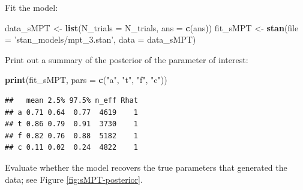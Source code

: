 \documentclass[12pt,]{krantz}
\newenvironment{Shaded}{\begin{snugshade}}{\end{snugshade}}
\newcommand{\KeywordTok}[1]{\textcolor[rgb]{0.13,0.29,0.53}{\textbf{#1}}}
\newcommand{\DataTypeTok}[1]{\textcolor[rgb]{0.13,0.29,0.53}{#1}}
\newcommand{\DecValTok}[1]{\textcolor[rgb]{0.00,0.00,0.81}{#1}}
\newcommand{\StringTok}[1]{\textcolor[rgb]{0.31,0.60,0.02}{#1}}
\newcommand{\OperatorTok}[1]{\textcolor[rgb]{0.81,0.36,0.00}{\textbf{#1}}}
\newcommand{\NormalTok}[1]{#1}
\theoremstyle{definition}
\theoremstyle{definition}
\theoremstyle{definition}
\theoremstyle{remark}
\begin{document}
Fit the model:

\begin{Shaded}
\begin{Highlighting}[]
\NormalTok{data_sMPT <-}\StringTok{  }\KeywordTok{list}\NormalTok{(}\DataTypeTok{N_trials =}\NormalTok{ N_trials,}
                   \DataTypeTok{ans =} \KeywordTok{c}\NormalTok{(ans)) }
\NormalTok{fit_sMPT <-}\StringTok{ }\KeywordTok{stan}\NormalTok{(}\DataTypeTok{file =} \StringTok{'stan_models/mpt_3.stan'}\NormalTok{, }\DataTypeTok{data =}\NormalTok{ data_sMPT)  }
\end{Highlighting}
\end{Shaded}

Print out a summary of the posterior of the parameter of interest:

\begin{Shaded}
\begin{Highlighting}[]
\KeywordTok{print}\NormalTok{(fit_sMPT, }\DataTypeTok{pars =} \KeywordTok{c}\NormalTok{(}\StringTok{"a"}\NormalTok{, }\StringTok{"t"}\NormalTok{, }\StringTok{"f"}\NormalTok{, }\StringTok{"c"}\NormalTok{))}
\end{Highlighting}
\end{Shaded}

\begin{verbatim}
##   mean 2.5% 97.5% n_eff Rhat
## a 0.71 0.64  0.77  4619    1
## t 0.86 0.79  0.91  3730    1
## f 0.82 0.76  0.88  5182    1
## c 0.11 0.02  0.24  4822    1
\end{verbatim}

Evaluate whether the model recovers the true parameters that generated
the data; see Figure \ref{fig:sMPT-posterior}.

\begin{Shaded}
\end{Shaded}
\end{document}
